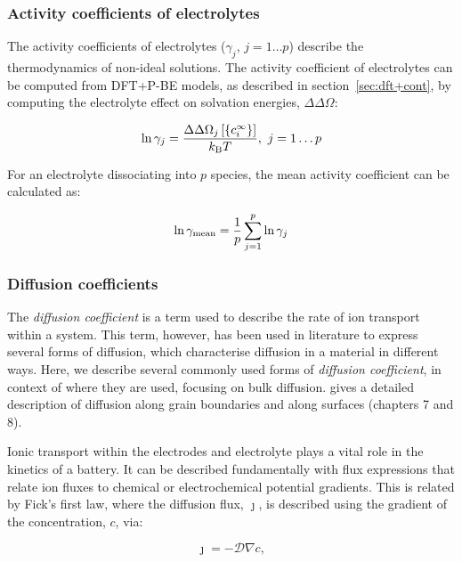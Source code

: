 \documentclass[../main.tex]{subfiles}
\begin{document}
\subsubsection{Activity coefficients of electrolytes}
\label{sec:tf}
The activity coefficients of electrolytes ($\gamma_j$, $j=1\dots p$) describe the thermodynamics of non-ideal solutions.\cite{Atkins2014} The activity coefficient of electrolytes can be computed from DFT+P-BE models, as described in section~\ref{sec:dft+cont}, by computing the electrolyte effect on solvation energies, $\Delta\Delta\Omega$:\cite{Ringe2016, Dziedzic2020}

\begin{equation}
    \label{eq:activityj}
   \ln{\gamma_j}  =\frac{\Delta\Delta\Omega_j\left[\{c_i^{\infty}\}\right]}{k_{\textrm{B}} T}, \ j=1\dots p
\end{equation}

For an electrolyte dissociating into $p$ species, the mean activity coefficient can be calculated as:

\begin{equation}
    \label{eq:activitymean}
    \ln \gamma_{\rm mean} = \frac{1}{p}\sum_{j=1}^p \ln \gamma_j
\end{equation}

\subsubsection{Diffusion coefficients}
\label{sec:diffusion}
The \textit{diffusion coefficient} is a term used to describe the rate of ion transport within a system. This term, however, has been used in literature to express several forms of diffusion, which characterise diffusion in a material in different ways. Here, we describe several commonly used forms of \textit{diffusion coefficient}, in context of where they are used, focusing on bulk diffusion. \citeauthor{heitjans2006diffusion} gives a detailed description of diffusion along grain boundaries and along surfaces (chapters 7 and 8).\cite{heitjans2006diffusion}

Ionic transport within the electrodes and electrolyte plays a vital role in the kinetics of a battery. It can be described fundamentally with flux expressions that relate ion fluxes to chemical or electrochemical potential gradients. This is related by Fick's first law, where the diffusion flux, $\boldsymbol{\jmath}$, is described using the gradient of the concentration, $c$, via:

\begin{equation}
    \boldsymbol{\jmath} = - \mathcal{D} \nabla c,
    \label{eq:fickfirst}
\end{equation}
\end{document}

